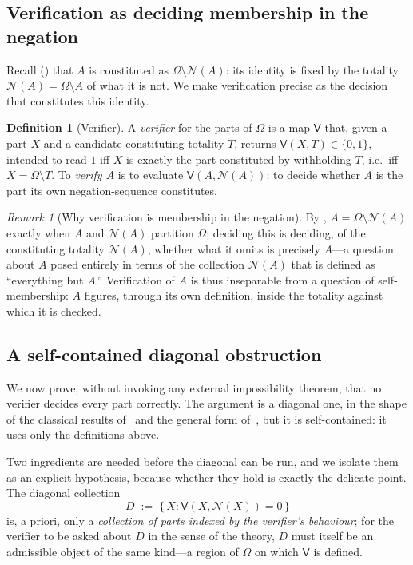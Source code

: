 \documentclass[11pt,twocolumn,a4paper]{article}
\theoremstyle{thmstyle}
\theoremstyle{definition}
\newtheorem{definition}[theorem]{Definition}
\theoremstyle{remark}
\newtheorem{remark}[theorem]{Remark}
\newcommand{\Space}{\Omega}
\newcommand{\Neg}{\mathcal{N}}
\newcommand{\Ver}{\mathsf{V}}
\begin{document}
\subsection{Verification as deciding membership in the negation}

Recall () that $A$ is constituted as $\Space\setminus\Neg(A)$:
its identity is fixed by the totality $\Neg(A)=\Space\setminus A$ of what it is
not. We make verification precise as the decision that constitutes this identity.

\begin{definition}[Verifier]
\label{def:verifier}
A \emph{verifier} for the parts of $\Space$ is a map $\Ver$ that, given a part
$X$ and a candidate constituting totality $T$, returns $\Ver(X,T)\in\{0,1\}$,
intended to read $1$ iff $X$ is exactly the part constituted by withholding $T$,
i.e.\ iff $X=\Space\setminus T$. To \emph{verify $A$} is to evaluate
$\Ver(A,\Neg(A))$: to decide whether $A$ is the part its own negation-sequence
constitutes.
\end{definition}

\begin{remark}[Why verification is membership in the negation]
\label{rem:ver-membership}
By , $A=\Space\setminus\Neg(A)$ exactly when $A$ and $\Neg(A)$
partition $\Space$; deciding this is deciding, of the constituting totality
$\Neg(A)$, whether what it omits is precisely $A$---a question about $A$ posed
entirely in terms of the collection $\Neg(A)$ that is defined as
``everything but $A$.'' Verification of $A$ is thus inseparable from a question
of self-membership: $A$ figures, through its own definition, inside the totality
against which it is checked.
\end{remark}

\subsection{A self-contained diagonal obstruction}

We now prove, without invoking any external impossibility theorem, that no
verifier decides every part correctly. The argument is a diagonal one, in the
shape of the classical results of~\citet{russell1903,cantor1891,tarski1936} and
the general form of~\citet{lawvere1969}, but it is self-contained: it uses only
the definitions above.

Two ingredients are needed before the diagonal can be run, and we isolate them as
an explicit hypothesis, because whether they hold is exactly the delicate point.
The diagonal collection
\[
D\;:=\;\bigl\{\,X : \Ver(X,\Neg(X))=0\,\bigr\}
\]
is, a priori, only a \emph{collection of parts indexed by the verifier's
behaviour}; for the verifier to be asked about $D$ in the sense of the theory, $D$
must itself be an admissible object of the same kind---a region of $\Space$ on
which $\Ver$ is defined.
\end{document}
